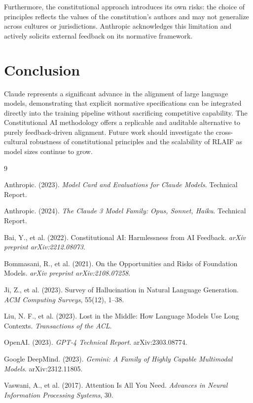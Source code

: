 \documentclass[10pt,twocolumn]{article}
\begin{document}
Furthermore, the constitutional approach introduces its own risks: the choice of principles reflects the values of the constitution's authors and may not generalize across cultures or jurisdictions. Anthropic acknowledges this limitation and actively solicits external feedback on its normative framework.

\section{Conclusion}
\label{sec:conclusion}

Claude represents a significant advance in the alignment of large language models, demonstrating that explicit normative specifications can be integrated directly into the training pipeline without sacrificing competitive capability. The Constitutional AI methodology offers a replicable and auditable alternative to purely feedback-driven alignment. Future work should investigate the cross-cultural robustness of constitutional principles and the scalability of RLAIF as model sizes continue to grow.

\begin{thebibliography}{9}

Anthropic. (2023). \textit{Model Card and Evaluations for Claude Models}. Technical Report.

Anthropic. (2024). \textit{The Claude 3 Model Family: Opus, Sonnet, Haiku}. Technical Report.

Bai, Y., et al. (2022). Constitutional AI: Harmlessness from AI Feedback. \textit{arXiv preprint arXiv:2212.08073}.

Bommasani, R., et al. (2021). On the Opportunities and Risks of Foundation Models. \textit{arXiv preprint arXiv:2108.07258}.

Ji, Z., et al. (2023). Survey of Hallucination in Natural Language Generation. \textit{ACM Computing Surveys}, 55(12), 1--38.

Liu, N. F., et al. (2023). Lost in the Middle: How Language Models Use Long Contexts. \textit{Transactions of the ACL}.

OpenAI. (2023). \textit{GPT-4 Technical Report}. arXiv:2303.08774.

Google DeepMind. (2023). \textit{Gemini: A Family of Highly Capable Multimodal Models}. arXiv:2312.11805.

Vaswani, A., et al. (2017). Attention Is All You Need. \textit{Advances in Neural Information Processing Systems}, 30.

\end{thebibliography}
\end{document}
